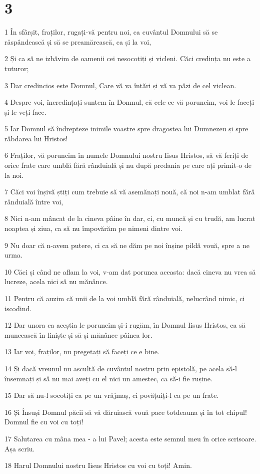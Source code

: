 \chapter{3}

\par 1 În sfârșit, fraților, rugați-vă pentru noi, ca cuvântul Domnului să se răspândească și să se preamărească, ca și la voi,
\par 2 Și ca să ne izbăvim de oamenii cei nesocotiți și vicleni. Căci credința nu este a tuturor;
\par 3 Dar credincios este Domnul, Care vă va întări și vă va păzi de cel viclean.
\par 4 Despre voi, încredințați suntem în Domnul, că cele ce vă poruncim, voi le faceți și le veți face.
\par 5 Iar Domnul să îndrepteze inimile voastre spre dragostea lui Dumnezeu și spre răbdarea lui Hristos!
\par 6 Fraților, vă poruncim în numele Domnului nostru Iisus Hristos, să vă feriți de orice frate care umblă fără rânduială și nu după predania pe care ați primit-o de la noi.
\par 7 Căci voi înșivă știți cum trebuie să vă asemănați nouă, că noi n-am umblat fără rânduială între voi,
\par 8 Nici n-am mâncat de la cineva pâine în dar, ci, cu muncă și cu trudă, am lucrat noaptea și ziua, ca să nu împovărăm pe nimeni dintre voi.
\par 9 Nu doar că n-avem putere, ci ca să ne dăm pe noi înșine pildă vouă, spre a ne urma.
\par 10 Căci și când ne aflam la voi, v-am dat porunca aceasta: dacă cineva nu vrea să lucreze, acela nici să nu mănânce.
\par 11 Pentru că auzim că unii de la voi umblă fără rânduială, nelucrând nimic, ci iscodind.
\par 12 Dar unora ca aceștia le poruncim și-i rugăm, în Domnul Iisus Hristos, ca să muncească în liniște și să-și mănânce pâinea lor.
\par 13 Iar voi, fraților, nu pregetați să faceți ce e bine.
\par 14 Și dacă vreunul nu ascultă de cuvântul nostru prin epistolă, pe acela să-l însemnați și să nu mai aveți cu el nici un amestec, ca să-i fie rușine.
\par 15 Dar să nu-l socotiți ca pe un vrăjmaș, ci povățuiți-l ca pe un frate.
\par 16 Și Însuși Domnul păcii să vă dăruiască vouă pace totdeauna și în tot chipul! Domnul fie cu voi cu toți!
\par 17 Salutarea cu mâna mea - a lui Pavel; acesta este semnul meu în orice scrisoare. Așa scriu.
\par 18 Harul Domnului nostru Iisus Hristos cu voi cu toți! Amin.


